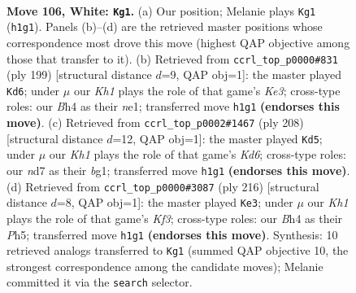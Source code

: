 \documentclass[11pt]{article}
\begin{document}
\clearpage

\begin{figure}[p]\centering
\begin{subfigure}{0.46\textwidth}\centering
\resizebox{\linewidth}{!}{%
\newchessgame
\chessboard[
  setfen={6k1/3n4/8/5P2/p6B/P6P/8/7K w - - 31 106},
  showmover=false,
  pgfstyle=straightmove, color=movearrow, markmove={h1-g1}
]}
\caption{}
\end{subfigure}\hfill
\begin{subfigure}{0.46\textwidth}\centering
\resizebox{\linewidth}{!}{%
\newchessgame
\chessboard[
  setfen={8/8/4k3/p7/P2K4/8/4p3/4N3 b - - 67 100},
  showmover=false,
  pgfstyle=straightmove, color=movearrow, markmove={e6-d6}
]}
\caption{}
\end{subfigure}
\\[4pt]
\begin{subfigure}{0.46\textwidth}\centering
\resizebox{\linewidth}{!}{%
\newchessgame
\chessboard[
  setfen={3B4/8/3K2k1/5p2/8/5P1P/8/6b1 w - - 24 105},
  showmover=false,
  pgfstyle=straightmove, color=movearrow, markmove={d6-d5}
]}
\caption{}
\end{subfigure}\hfill
\begin{subfigure}{0.46\textwidth}\centering
\resizebox{\linewidth}{!}{%
\newchessgame
\chessboard[
  setfen={8/6k1/3p4/p6P/2P4P/5K2/8/8 w - - 0 109},
  showmover=false,
  pgfstyle=straightmove, color=movearrow, markmove={f3-e3}
]}
\caption{}
\end{subfigure}
\caption{\textbf{Move 106, White: \texttt{Kg1}.} (a) Our position; Melanie plays \texttt{Kg1} (\texttt{h1g1}). Panels (b)--(d) are the retrieved master positions whose correspondence most drove this move (highest QAP objective among those that transfer to it). (b) Retrieved from \texttt{ccrl\_top\_p0000\#831} (ply 199) [structural distance $d$=9, QAP obj=1]: the master played \texttt{Kd6}; under $\mu$ our \emph{Kh1} plays the role of that game's \emph{Ke3}; cross-type roles: our \emph{B}h4 as their \emph{n}e1; transferred move \texttt{h1g1} \textbf{(endorses this move)}. (c) Retrieved from \texttt{ccrl\_top\_p0002\#1467} (ply 208) [structural distance $d$=12, QAP obj=1]: the master played \texttt{Kd5}; under $\mu$ our \emph{Kh1} plays the role of that game's \emph{Kd6}; cross-type roles: our \emph{n}d7 as their \emph{b}g1; transferred move \texttt{h1g1} \textbf{(endorses this move)}. (d) Retrieved from \texttt{ccrl\_top\_p0000\#3087} (ply 216) [structural distance $d$=8, QAP obj=1]: the master played \texttt{Ke3}; under $\mu$ our \emph{Kh1} plays the role of that game's \emph{Kf3}; cross-type roles: our \emph{B}h4 as their \emph{P}h5; transferred move \texttt{h1g1} \textbf{(endorses this move)}. Synthesis: 10 retrieved analogs transferred to \texttt{Kg1} (summed QAP objective 10, the strongest correspondence among the candidate moves); Melanie committed it via the \texttt{search} selector.}
\label{fig:thought-m210}
\end{figure}
\end{document}
